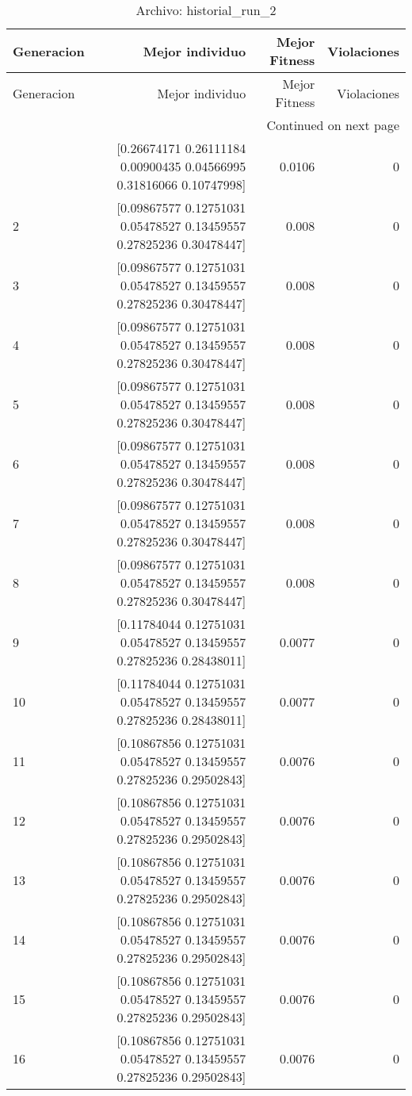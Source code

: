 \begin{longtable}{lrrr}
\caption{Archivo: historial\_run\_2}\label{tab:historial_run_2} \\
\toprule
Generacion & Mejor individuo & Mejor Fitness & Violaciones \\
\midrule
\endfirsthead
\toprule
Generacion & Mejor individuo & Mejor Fitness & Violaciones \\
\midrule
\endhead
\midrule
\multicolumn{4}{r}{Continued on next page} \\
\midrule
\endfoot
\bottomrule
\endlastfoot
1 & [0.26674171 0.26111184 0.00900435 0.04566995 0.31816066 0.10747998] & 0.0106 & 0 \\
2 & [0.09867577 0.12751031 0.05478527 0.13459557 0.27825236 0.30478447] & 0.008 & 0 \\
3 & [0.09867577 0.12751031 0.05478527 0.13459557 0.27825236 0.30478447] & 0.008 & 0 \\
4 & [0.09867577 0.12751031 0.05478527 0.13459557 0.27825236 0.30478447] & 0.008 & 0 \\
5 & [0.09867577 0.12751031 0.05478527 0.13459557 0.27825236 0.30478447] & 0.008 & 0 \\
6 & [0.09867577 0.12751031 0.05478527 0.13459557 0.27825236 0.30478447] & 0.008 & 0 \\
7 & [0.09867577 0.12751031 0.05478527 0.13459557 0.27825236 0.30478447] & 0.008 & 0 \\
8 & [0.09867577 0.12751031 0.05478527 0.13459557 0.27825236 0.30478447] & 0.008 & 0 \\
9 & [0.11784044 0.12751031 0.05478527 0.13459557 0.27825236 0.28438011] & 0.0077 & 0 \\
10 & [0.11784044 0.12751031 0.05478527 0.13459557 0.27825236 0.28438011] & 0.0077 & 0 \\
11 & [0.10867856 0.12751031 0.05478527 0.13459557 0.27825236 0.29502843] & 0.0076 & 0 \\
12 & [0.10867856 0.12751031 0.05478527 0.13459557 0.27825236 0.29502843] & 0.0076 & 0 \\
13 & [0.10867856 0.12751031 0.05478527 0.13459557 0.27825236 0.29502843] & 0.0076 & 0 \\
14 & [0.10867856 0.12751031 0.05478527 0.13459557 0.27825236 0.29502843] & 0.0076 & 0 \\
15 & [0.10867856 0.12751031 0.05478527 0.13459557 0.27825236 0.29502843] & 0.0076 & 0 \\
16 & [0.10867856 0.12751031 0.05478527 0.13459557 0.27825236 0.29502843] & 0.0076 & 0 \\

\end{longtable}

